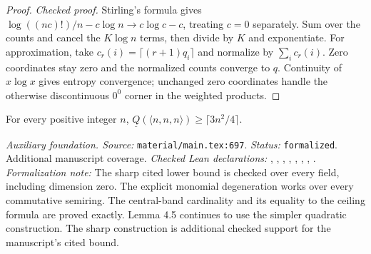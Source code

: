 \begin{proof}
\leanok
{}
\textit{Checked proof.} Stirling's formula gives $\log((nc)!)/n-c\log n\to c\log c-c$, treating $c=0$ separately. Sum over the counts and cancel the $K\log n$ terms, then divide by $K$ and exponentiate. For approximation, take $c_r(i)=\lceil(r+1)q_i\rceil$ and normalize by $\sum_i c_r(i)$. Zero coordinates stay zero and the normalized counts converge to $q$. Continuity of $x\log x$ gives entropy convergence; unchanged zero coordinates handle the otherwise discontinuous $0^0$ corner in the weighted products.
\end{proof}

\renewcommand{\thetheorem}{A10}
\begin{lemma}
\label{aux:matrix-mul-border-subrank}
\leanok
For every positive integer $n$, $\underline Q(\langle n,n,n\rangle)\ge\lceil3n^2/4\rceil$.
\end{lemma}

\noindent\textit{Auxiliary foundation. Source:} \texttt{material/main.tex:697}.
\textit{Status:} \texttt{formalized}. Additional manuscript coverage.
\textit{Checked Lean declarations:} , , , , , , , .
\textit{Formalization note:} The sharp cited lower bound is checked over every field, including dimension zero. The explicit monomial degeneration works over every commutative semiring. The central-band cardinality and its equality to the ceiling formula are proved exactly. Lemma 4.5 continues to use the simpler quadratic construction. The sharp construction is additional checked support for the manuscript’s cited bound.

